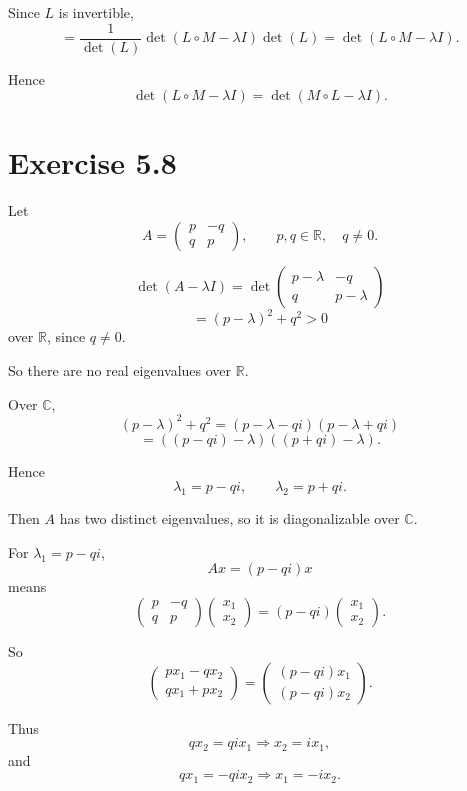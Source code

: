 \documentclass[11pt,a4paper]{article}
\begin{document}
Since $L$ is invertible,
\[
=\frac{1}{\det(L)}\det(L\circ M-\lambda I)\det(L)
=\det(L\circ M-\lambda I).
\]

Hence
\[
\det(L\circ M-\lambda I)=\det(M\circ L-\lambda I).
\]

\section*{Exercise 5.8}

Let
\[
A=\begin{pmatrix}
p & -q\\
q & p
\end{pmatrix},
\qquad p,q\in\mathbb R,\quad q\neq0.
\]

\[
\det(A-\lambda I)
=\det\begin{pmatrix}
p-\lambda & -q\\
q & p-\lambda
\end{pmatrix}
\]
\[
=(p-\lambda)^2+q^2>0
\]
over $\mathbb R$, since $q\neq0$.

So there are no real eigenvalues over $\mathbb R$.

Over $\mathbb C$,
\[
(p-\lambda)^2+q^2
=(p-\lambda-qi)(p-\lambda+qi)
\]
\[
=((p-qi)-\lambda)((p+qi)-\lambda).
\]

Hence
\[
\lambda_1=p-qi,\qquad \lambda_2=p+qi.
\]

Then $A$ has two distinct eigenvalues, so it is diagonalizable over $\mathbb C$.

For $\lambda_1=p-qi$,
\[
Ax=(p-qi)x
\]
means
\[
\begin{pmatrix}
p & -q\\
q & p
\end{pmatrix}
\begin{pmatrix}
x_1\\
x_2
\end{pmatrix}
=
(p-qi)
\begin{pmatrix}
x_1\\
x_2
\end{pmatrix}.
\]

So
\[
\begin{pmatrix}
px_1-qx_2\\
qx_1+px_2
\end{pmatrix}
=
\begin{pmatrix}
(p-qi)x_1\\
(p-qi)x_2
\end{pmatrix}.
\]

Thus
\[
qx_2=qix_1\Rightarrow x_2=ix_1,
\]
and
\[
qx_1=-qix_2\Rightarrow x_1=-ix_2.
\]
\end{document}
